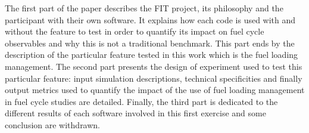 The first part of the paper describes the FIT project, its philosophy and the
participant with their own software. It explains how each code is used with and
without the feature to test in order to quantify its impact on fuel cycle
observables and why this is not a traditional benchmark. This part ends by the
description of the particular feature tested in this work which is the fuel
loading management. The second part presents the design of experiment used to
test this particular feature: input simulation descriptions, technical
specificities and finally output metrics used to quantify the impact of the use
of fuel loading management in fuel cycle studies are detailed. Finally, the
third part is dedicated to the different results of each software involved in
this first exercise and some conclusion are withdrawn.
